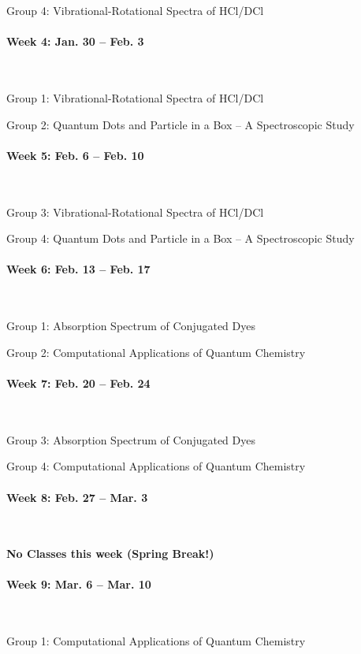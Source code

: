 \documentclass[12pt, letterpaper]{article}
\begin{document}
Group 4: Vibrational-Rotational Spectra of HCl/DCl

\paragraph{Week 4: Jan. 30 -- Feb. 3}~

Group 1: Vibrational-Rotational Spectra of HCl/DCl

Group 2: Quantum Dots and Particle in a Box – A Spectroscopic Study
\paragraph{Week 5: Feb. 6 -- Feb. 10}~

Group 3: Vibrational-Rotational Spectra of HCl/DCl

Group 4: Quantum Dots and Particle in a Box – A Spectroscopic Study

\paragraph{Week 6: Feb. 13 -- Feb. 17}~

Group 1: Absorption Spectrum of Conjugated Dyes

Group 2: Computational Applications of Quantum Chemistry

\paragraph{Week 7: Feb. 20 -- Feb. 24}~

Group 3: Absorption Spectrum of Conjugated Dyes

Group 4: Computational Applications of Quantum Chemistry

\paragraph{Week 8: Feb. 27 -- Mar. 3}~

\textbf{No Classes this week (Spring Break!)}

\paragraph{Week 9: Mar. 6 -- Mar. 10}~

Group 1: Computational Applications of Quantum Chemistry
\end{document}
